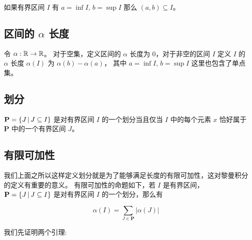 如果有界区间 $I$ 有 $a = \inf I,\, b = \sup I$ 那么 $(a,b) \subseteq I$。

\subsection{区间的 $\alpha$ 长度}
令 $\alpha: \mathbb{R} \to \mathbb{R}$。
对于空集，定义区间的 $\alpha$ 长度为 $0$，对于非空的区间 $I$ 定义 $I$ 的 $\alpha$ 长度 $\alpha(I)$ 为 $\alpha(b)-\alpha(a)$，
其中 $a = \inf I,\, b = \sup I$
这里也包含了单点集。

\subsection{划分}

$\mathbf{P} = \{ J \,\vert\, J \subseteq I \}$ 是对有界区间 $I$ 的一个划分当且仅当 $I$ 中的每个元素 $x$ 恰好属于 $\mathbf{P}$ 中的一个有界区间 $J$。

\subsection{有限可加性}

我们上面之所以这样定义划分就是为了能够满足长度的有限可加性，这对黎曼积分的定义有重要的意义。
有限可加性的命题如下，若 $I$ 是有界区间，$\mathbf{P} = \{ J \,\vert\, J \subseteq I \}$ 是对有界区间 $I$ 的一个划分，那么有

\[
    \alpha(I) = \sum_{J \in \mathbf{P}} \lvert \alpha(J) \rvert
\]

我们先证明两个引理:

